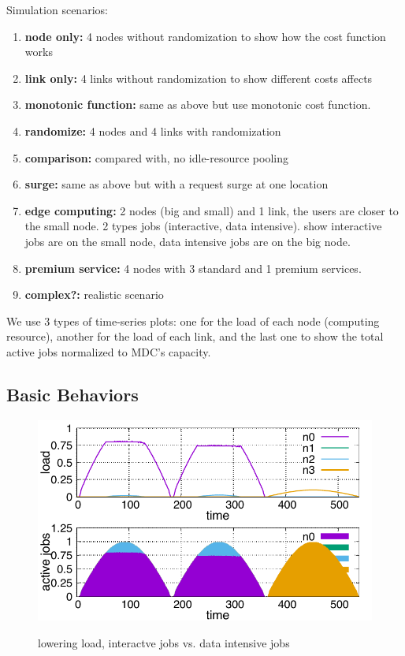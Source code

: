 Simulation scenarios:
\begin{enumerate}
  \item	{\bf node only:} 4 nodes without randomization to show how the
        cost function works
  \item	{\bf link only:} 4 links without randomization to show
        different costs affects
  \item	{\bf monotonic function:} same as above but use monotonic cost
        function.
  \item	{\bf randomize:} 4 nodes and 4 links with randomization
  \item {\bf comparison:} compared with, no idle-resource pooling
  \item	{\bf surge:} same as above but with a request surge at one location
  \item	{\bf edge computing:} 2 nodes (big and small) and 1 link, the
    users are closer to the small node. 2 types jobs (interactive,
    data intensive).  show interactive jobs are on the small node,
    data intensive jobs are on the big node.
  \item {\bf premium service:} 4 nodes with 3 standard and 1 premium services.
  \item	{\bf complex?:} realistic scenario
\end{enumerate}

We use 3 types of time-series plots: one for the load of each node
(computing resource), another for the load of each link, and the last
one to show the total active jobs normalized to MDC's capacity.

\subsection{Basic Behaviors}

\begin{figure}[tb]
  \begin{center}
    \includegraphics[width=1.0\columnwidth]{lowering.pdf}
    \vspace{-2.0ex}
    \caption{lowering load, interactve jobs vs. data intensive jobs}
    \label{fig:lowering}
  \end{center}
\end{figure}

